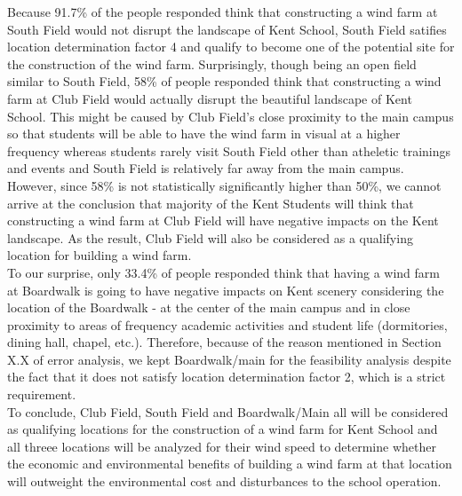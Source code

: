 \documentclass[review]{elsarticle}
\begin{document}
Because 91.7\% of the people responded think that constructing a wind farm at South Field would not disrupt the landscape of Kent School, South Field satifies location determination factor 4 
and qualify to become one of the potential site for the construction of the wind farm. Surprisingly, though being an open field similar to South Field, 58\% of people responded think that constructing
a wind farm at Club Field would actually disrupt the beautiful landscape of Kent School. This might be caused by Club Field's close proximity to the main campus so that students will be able to 
have the wind farm in visual at a higher frequency whereas students rarely visit South Field other than atheletic trainings and events and South Field is relatively far away from the main campus. 
However, since 58\% is not statistically significantly higher than 50\%, we cannot arrive at the conclusion that majority of the Kent Students will think that constructing a wind farm at Club Field 
will have negative impacts on the Kent landscape. As the result, Club Field will also be considered as a qualifying location for building a wind farm.
\\\indent To our surprise, only 33.4\% of people responded think that having a wind farm at Boardwalk is going to have negative impacts on Kent scenery considering the location of the Boardwalk - at the center of 
the main campus and in close proximity to areas of frequency academic activities and student life (dormitories, dining hall, chapel, etc.). Therefore, because of the reason mentioned in Section X.X of 
error analysis, we kept Boardwalk/main for the feasibility analysis despite the fact that it does not satisfy location determination factor 2, which is a strict requirement.
\\\indent To conclude, Club Field, South Field and Boardwalk/Main all will be considered as qualifying locations for the construction of a wind farm for Kent School and all threee locations will be analyzed 
for their wind speed to determine whether the economic and environmental benefits of building a wind farm at that location will outweight the environmental cost and disturbances to the school operation.



\clearpage
    
\end{document}
